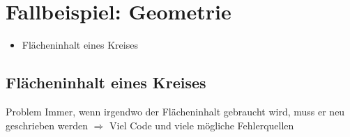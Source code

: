 



\subtitle{Kapitel 6: wie Funktionen funktionieren}
	\titlegraphic{
		\begin{columns}
			\begin{column}{6cm}
				\vspace{18mm}
				\begin{center}
					{\huge Funktionen Fallbeispiel}
				\end{center}
			\end{column}
		\end{columns}}
\maketitle

\section{Fallbeispiel: Geometrie}
\begin{frame}
	\slidehead

	\begin{figure}
		\centering
	\end{figure}
	\vspace{-10mm}
	\begin{itemize}
		\item Flächeninhalt eines Kreises
	\end{itemize}
\end{frame}

\subsection{Flächeninhalt eines Kreises}
\begin{frame}
	\slidehead

	\begin{block}{Problem}
		Immer, wenn irgendwo der Flächeninhalt gebraucht wird, muss er neu geschrieben werden $\Rightarrow$ Viel Code und viele mögliche Fehlerquellen
	\end{block}
\end{frame}

